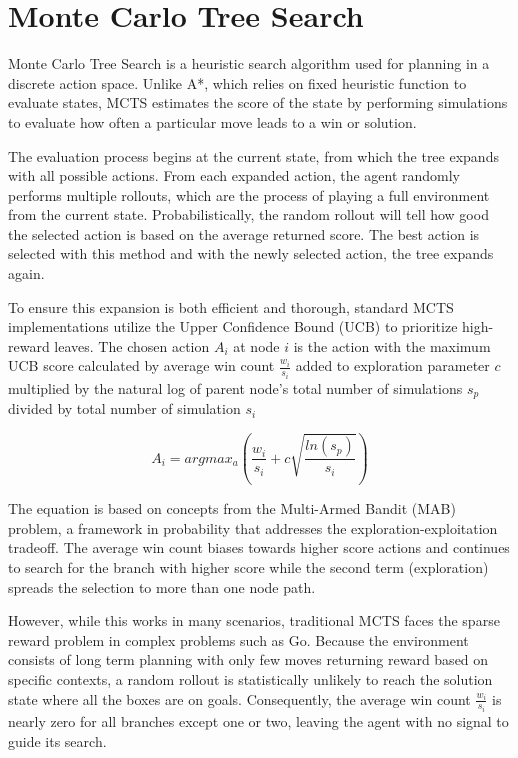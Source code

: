 \section{Monte Carlo Tree Search}
Monte Carlo Tree Search is a heuristic search algorithm used for planning in a discrete action space. \cite{coulom2008monte} Unlike A*, which relies on fixed heuristic function to evaluate states, MCTS estimates the score of the state by performing simulations to evaluate how often a particular move leads to a win or solution.

The evaluation process begins at the current state, from which the tree expands with all possible actions. From each expanded action, the agent randomly performs multiple rollouts, which are the process of playing a full environment from the current state. Probabilistically, the random rollout will tell how good the selected action is based on the average returned score. The best action is selected with this method and with the newly selected action, the tree expands again. 

To ensure this expansion is both efficient and thorough, standard MCTS implementations utilize the Upper Confidence Bound (UCB) to prioritize high-reward leaves. The chosen action $A_i$ at node $i$ is the action with the maximum UCB score calculated by average win count $\frac{w_i}{s_i}$ added to exploration parameter $c$ multiplied by the natural log of parent node's total number of simulations $s_p$ divided by total number of simulation $s_i$

$$A_i = argmax_a(\frac{w_i}{s_i} + c\sqrt{\frac{ln(s_p)}{s_i}})$$

The equation is based on concepts from the Multi-Armed Bandit (MAB) problem, a framework in probability that addresses the exploration-exploitation tradeoff. The average win count biases towards higher score actions and continues to search for the branch with higher score while the second term (exploration) spreads the selection to more than one node path. 

However, while this works in many scenarios, traditional MCTS faces the sparse reward problem in complex problems such as Go. Because the environment consists of long term planning with only few moves returning reward based on specific contexts, a random rollout is statistically unlikely to reach the solution state where all the boxes are on goals. Consequently, the average win count $\frac{w_i}{s_i}$ is nearly zero for all branches except one or two, leaving the agent with no signal to guide its search.

